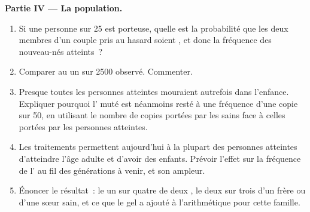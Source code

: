 \begin{problem}
\medskip
\noindent\textbf{Partie IV --- La population.}
\begin{enumerate}[resume]
  \item Si une personne sur 25 est porteuse, quelle est la probabilité
        que les deux membres d'un couple pris au hasard soient
        , et donc la fréquence des nouveau-nés atteints~?
  \item Comparer au un sur 2500 observé. Commenter.
  \item Presque toutes les personnes atteintes mouraient autrefois dans
        l'enfance. Expliquer pourquoi l' muté est néanmoins resté
        à une fréquence d'une copie sur 50, en utilisant le nombre de
        copies portées par les  sains face à celles portées par
        les personnes atteintes.
  \item Les traitements permettent aujourd'hui à la plupart des
        personnes atteintes d'atteindre l'âge adulte et d'avoir des
        enfants. Prévoir l'effet sur la fréquence de l' au fil
        des générations à venir, et son ampleur.
  \item Énoncer le résultat~: le un sur quatre de deux , le
        deux sur trois d'un frère ou d'une sœur sain, et ce que le gel
        a ajouté à l'arithmétique pour cette famille.
\end{enumerate}
\end{problem}
